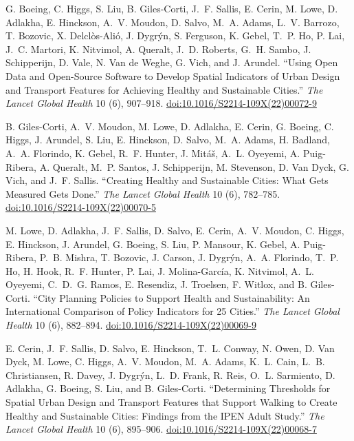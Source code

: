 \begin{tablist}
        \item[2022] \tab{}G. Boeing, C. Higgs, S. Liu, B. Giles-Corti, J.~F. Sallis, E. Cerin, M. Lowe, D. Adlakha, E. Hinckson, A.~V. Moudon, D. Salvo, M.~A. Adams, L.~V. Barrozo, T. Bozovic, X. Delclòs-Alió, J. Dygrýn, S. Ferguson, K. Gebel, T.~P. Ho, P. Lai, J.~C. Martori, K. Nitvimol, A. Queralt, J.~D. Roberts, G.~H. Sambo, J. Schipperijn, D. Vale, N. Van de Weghe, G. Vich, and J. Arundel. \enquote{Using Open Data and Open-Source Software to Develop Spatial Indicators of Urban Design and Transport Features for Achieving Healthy and Sustainable Cities.} \textit{The Lancet Global Health} 10 (6), 907--918. \href{https://doi.org/10.1016/S2214-109X(22)00072-9}{doi:10.1016/S2214-109X(22)00072-9}

        \item[2022] \tab{}B. Giles-Corti, A.~V. Moudon, M. Lowe, D. Adlakha, E. Cerin, G. Boeing, C. Higgs, J. Arundel, S. Liu, E. Hinckson, D. Salvo, M.~A. Adams, H. Badland, A.~A. Florindo, K. Gebel, R.~F. Hunter, J. Mitáš, A.~L. Oyeyemi, A. Puig-Ribera, A. Queralt, M.~P. Santos, J. Schipperijn, M. Stevenson, D. Van Dyck, G. Vich, and J.~F. Sallis. \enquote{Creating Healthy and Sustainable Cities: What Gets Measured Gets Done.} \textit{The Lancet Global Health} 10 (6), 782--785. \href{https://doi.org/10.1016/S2214-109X(22)00070-5}{doi:10.1016/S2214-109X(22)00070-5}

        \item[2022] \tab{}M. Lowe, D. Adlakha, J.~F. Sallis, D. Salvo, E. Cerin, A.~V. Moudon, C. Higgs, E. Hinckson, J. Arundel, G. Boeing, S. Liu, P. Mansour, K. Gebel, A. Puig-Ribera, P.~B. Mishra, T. Bozovic, J. Carson, J. Dygrýn, A.~A. Florindo, T.~P. Ho, H. Hook, R.~F. Hunter, P. Lai, J. Molina-García, K. Nitvimol, A.~L. Oyeyemi, C.~D.~G. Ramos, E. Resendiz, J. Troelsen, F. Witlox, and B. Giles-Corti. \enquote{City Planning Policies to Support Health and Sustainability: An International Comparison of Policy Indicators for 25 Cities.}  \textit{The Lancet Global Health} 10 (6), 882--894. \href{https://doi.org/10.1016/S2214-109X(22)00069-9}{doi:10.1016/S2214-109X(22)00069-9}

        \item[2022] \tab{}E. Cerin, J.~F. Sallis, D. Salvo, E. Hinckson, T.~L. Conway, N. Owen, D. Van Dyck, M. Lowe, C. Higgs, A.~V. Moudon, M.~A. Adams, K.~L. Cain, L.~B. Christiansen, R. Davey, J. Dygrýn, L.~D. Frank, R. Reis, O.~L. Sarmiento, D. Adlakha, G. Boeing, S. Liu, and B. Giles-Corti. \enquote{Determining Thresholds for Spatial Urban Design and Transport Features that Support Walking to Create Healthy and Sustainable Cities: Findings from the IPEN Adult Study.}  \textit{The Lancet Global Health} 10 (6), 895--906. \href{https://doi.org/10.1016/S2214-109X(22)00068-7}{doi:10.1016/S2214-109X(22)00068-7}


\end{tablist}
